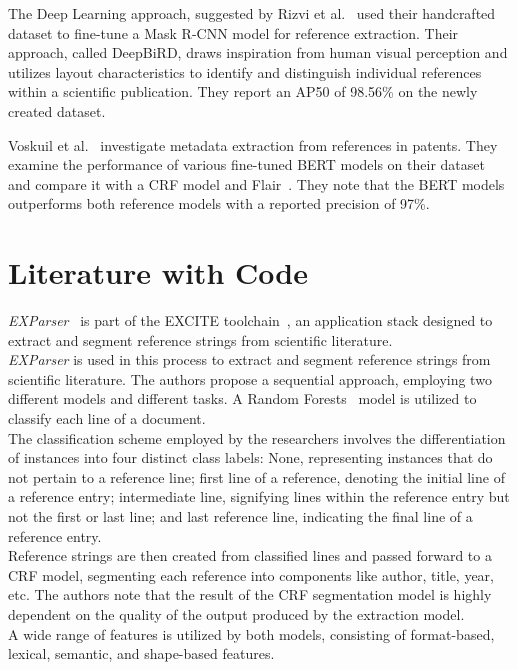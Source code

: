 The Deep Learning approach, suggested by Rizvi et al.~\cite{rizvi2020hybrid} used their handcrafted dataset to fine-tune a Mask R-CNN model for reference extraction. Their approach, called DeepBiRD, draws inspiration from human visual perception and utilizes layout characteristics to identify and distinguish individual references within a scientific publication. They report an AP50 of 98.56\% on the newly created dataset.\par
Voskuil et al.~\cite{voskuil2021improving} investigate metadata extraction from references in patents. They examine the performance of various fine-tuned BERT models on their dataset and compare it with a CRF model and Flair~\cite{akbik2019flair}. They note that the BERT models outperforms both reference models with a reported precision of 97\%.

\section{Literature with Code}\label{sec:literature_code}
\textit{EXParser}~\cite{excite_methods} is part of the EXCITE toolchain~\cite{excite_toolchain}, an application stack designed to extract and segment reference strings from scientific literature.\\
\textit{EXParser} is used in this process to extract and segment reference strings from scientific literature. The authors propose a sequential approach, employing two different models and different tasks. A Random Forests~\cite{breiman2001random} model is utilized to classify each line of a document.\\
The classification scheme employed by the researchers involves the differentiation of instances into four distinct class labels: None, representing instances that do not pertain to a reference line; first line of a reference, denoting the initial line of a reference entry; intermediate line, signifying lines within the reference entry but not the first or last line; and last reference line, indicating the final line of a reference entry.\\
Reference strings are then created from classified lines and passed forward to a CRF model, segmenting each reference into components like author, title, year, etc. The authors note that the result of the CRF segmentation model is highly dependent on the quality of the output produced by the extraction model.\\
A wide range of features is utilized by both models, consisting of format-based, lexical, semantic, and shape-based features.\\
